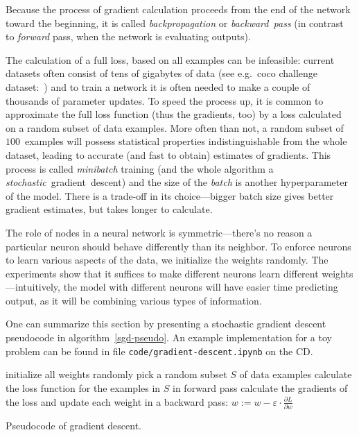 Because the process of gradient calculation proceeds from the end of the network toward the beginning, it is called \emph{backpropagation} or \emph{backward~pass} (in contrast to \emph{forward} pass, when the network is evaluating outputs).

The calculation of a full loss, based on all examples can be infeasible: current datasets often consist of tens of gigabytes of data (see e.g.~coco challenge dataset:~\cite{coco-dataset}) and to train a network it is often needed to make a couple of thousands of parameter updates.
To speed the process up, it is common to approximate the full loss function (thus the gradients, too) by a loss calculated on a random subset of data examples. More often than not, a random subset of $100$~examples will possess statistical properties indistinguishable from the whole dataset, leading to accurate (and fast to obtain) estimates of gradients. This process is called \emph{minibatch} training (and the whole algorithm a \emph{stochastic}~gradient~descent) and the size of the \emph{batch} is another hyperparameter of the model. There is a trade-off in its choice---bigger batch size gives better gradient estimates, but takes longer to calculate.

The role of nodes in a neural network is symmetric---there's no reason a particular neuron should behave differently than its neighbor. To enforce neurons to learn various aspects of the data, we initialize the weights randomly. The experiments show that it suffices to make different neurons learn different weights---intuitively, the model with different neurons will have easier time predicting output, as it will be combining various types of information.

One can summarize this section by presenting a stochastic gradient descent pseudocode in algorithm~\ref{sgd-pseudo}. An example implementation for a toy problem can be found in file \texttt{code/gradient-descent.ipynb} on the CD.

\begin{algorithm} \label{sgd-pseudo}
  initialize all weights randomly\;
   {
    pick a random subset $S$ of data examples\;
    calculate the loss function for the examples in $S$ in forward pass\;
    calculate the gradients of the loss and update each weight in a backward pass:
    $w := w - \varepsilon \cdot \frac{\partial L}{\partial w}$
  }
  \caption{Pseudocode of gradient descent.}
\end{algorithm}


